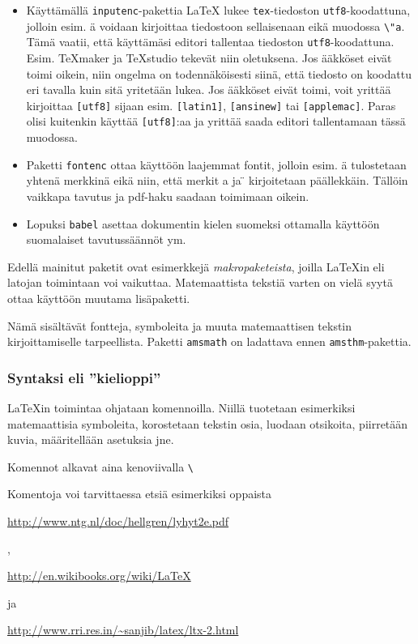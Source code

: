 \begin{frame}[fragile]
    \begin{extra}
        \begin{itemize}
            \item Käyttämällä \verb-inputenc--pakettia \LaTeX{} lukee \verb-tex--tiedoston \verb-utf8--koodattuna, jolloin esim. ä voidaan kirjoittaa tiedostoon sellaisenaan eikä muodossa \verb-\"a-. Tämä vaatii, että käyttämäsi editori tallentaa tiedoston \verb-utf8--koodattuna. Esim. TeXmaker ja TeXstudio tekevät niin oletuksena. Jos ääkköset eivät toimi oikein, niin ongelma on todennäköisesti siinä, että tiedosto on koodattu eri tavalla kuin sitä yritetään lukea. Jos ääkköset eivät toimi, voit yrittää kirjoittaa \verb-[utf8]- sijaan esim. \verb-[latin1]-, \verb-[ansinew]- tai \verb-[applemac]-. Paras olisi kuitenkin käyttää \verb-[utf8]-:aa ja yrittää saada editori tallentamaan tässä muodossa.
            \item Paketti \verb-fontenc- ottaa käyttöön laajemmat fontit, jolloin esim. ä tulostetaan yhtenä merkkinä eikä niin, että merkit a ja \"{} kirjoitetaan päällekkäin. Tällöin vaikkapa tavutus ja pdf-haku saadaan toimimaan oikein.
            \item Lopuksi \verb-babel- asettaa dokumentin kielen suomeksi ottamalla käyttöön suomalaiset tavutussäännöt ym.
        \end{itemize}
    \end{extra}
\end{frame}
\begin{frame}[fragile]
    
\end{frame}
\begin{frame}[fragile]
    Edellä mainitut paketit ovat esimerkkejä \textit{makropaketeista}, joilla \LaTeX in eli latojan toimintaan voi vaikuttaa. 
    \pause
    Matemaattista tekstiä varten on vielä syytä ottaa käyttöön muutama lisäpaketti. 
    
    \pause
    Nämä sisältävät fontteja, symboleita ja muuta matemaattisen tekstin kirjoittamiselle tarpeellista. Paketti \verb-amsmath- on ladattava ennen \verb-amsthm--pakettia.
\end{frame}
\begin{frame}[fragile]
    \frametitle{Syntaksi eli ''kielioppi''}
    \LaTeX in toimintaa ohjataan komennoilla. \pause Niillä tuotetaan esimerkiksi matemaattisia symboleita, korostetaan tekstin osia, luodaan otsikoita, piirretään kuvia, määritellään asetuksia jne.  \pause
    \begin{framed}
        Komennot alkavat aina kenoviivalla \verb-\-
    \end{framed}
    \pause
    Komentoja voi tarvittaessa etsiä esimerkiksi oppaista \begin{scriptsize}
        \url{http://www.ntg.nl/doc/hellgren/lyhyt2e.pdf}
    \end{scriptsize},
    \begin{scriptsize}
        \url{http://en.wikibooks.org/wiki/LaTeX}
    \end{scriptsize} ja
    \begin{scriptsize}
        \url{http://www.rri.res.in/~sanjib/latex/ltx-2.html}
    \end{scriptsize}
\end{frame}
